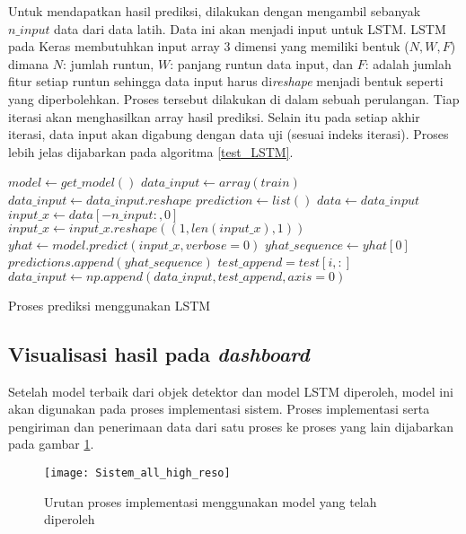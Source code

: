 \documentclass[../thesis.tex]{subfiles}
\begin{document}
Untuk mendapatkan hasil prediksi, dilakukan dengan mengambil sebanyak $n\_input$ data dari data latih. Data ini akan menjadi input untuk LSTM. LSTM pada Keras membutuhkan input array 3 dimensi yang memiliki bentuk ($N, W, F$) dimana $N$: jumlah runtun, $W$: panjang runtun data input, dan $F$: adalah jumlah fitur setiap runtun sehingga data input harus di\textit{reshape} menjadi bentuk seperti yang diperbolehkan.
Proses tersebut dilakukan di dalam sebuah perulangan. Tiap iterasi akan menghasilkan array hasil prediksi. Selain itu pada setiap akhir iterasi, data input akan digabung dengan data uji (sesuai indeks iterasi). Proses lebih jelas dijabarkan pada algoritma \ref{test_LSTM}.
\begin{algorithm}[htp]
	\begin{algorithmic}[1]
		\State $model \leftarrow get\_model()$
		\State $data\_input \leftarrow array(train)$
		\State $data\_input \leftarrow data\_input.reshape$
		\State $prediction \leftarrow list()$
			\State $data \leftarrow data\_input$
			\State $input\_x \leftarrow data[-n\_input:,0]$
			\State $input\_x \leftarrow input\_x.reshape((1, len(input\_x), 1))$
			\State $yhat \leftarrow model.predict(input\_x, verbose=0)$
			\State $yhat\_sequence \leftarrow yhat[0]$
			\State $predictions.append(yhat\_sequence)$
			\State $test\_append = test[i, :]$
			\State $data\_input \leftarrow np.append(data\_input, test\_append, axis=0)$
		\EndFor
	\EndFunction
	\end{algorithmic}
	\caption{Proses prediksi menggunakan LSTM}
	\label{test_LSTM}
\end{algorithm}

\subsection{Visualisasi hasil pada \textit{dashboard}}

Setelah model terbaik dari objek detektor dan model LSTM diperoleh, model ini akan digunakan pada proses implementasi sistem. Proses implementasi serta pengiriman dan penerimaan data dari satu proses ke proses yang lain dijabarkan pada gambar \ref{implementasi_sistem}.

\begin{figure}[htp]
	\centering
	\texttt{[image: Sistem\_all\_high\_reso]}
	\caption{Urutan proses implementasi menggunakan model yang telah diperoleh}
	\label{implementasi_sistem}
\end{figure}
\end{document}
